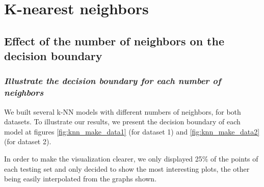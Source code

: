 \section{K-nearest neighbors}

\subsection{Effect of the number of neighbors on the decision boundary}

\subsubsection{{\it Illustrate the decision boundary for each number of neighbors}}
We built several k-NN models with different numbers of neighbors, for both datasets. To illustrate our results, we present the decision boundary of each model at figures \ref{fig:knn_make_data1} (for dataset 1) and \ref{fig:knn_make_data2} (for dataset 2).\par
In order to make the visualization clearer, we only displayed \num{25}\% of the points of each testing set and only decided to show the most interesting plots, the other being easily interpolated from the graphs shown.
